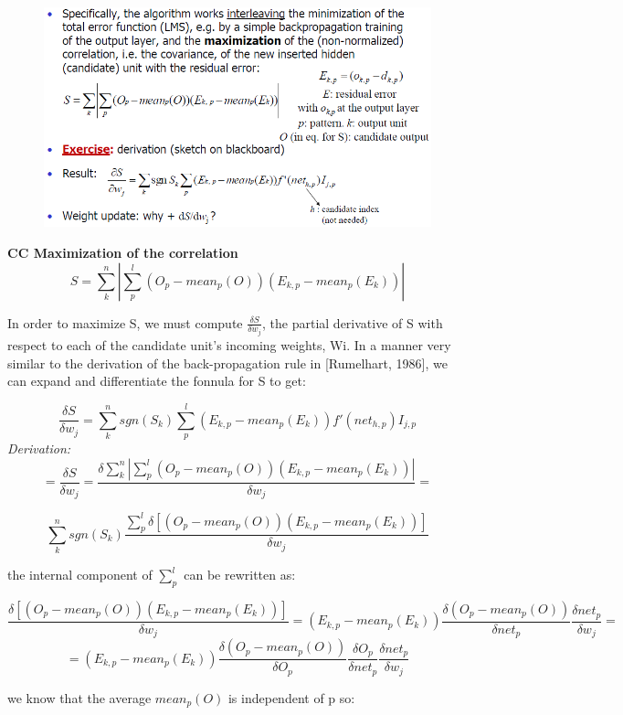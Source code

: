 \documentclass[../main.tex]{subfiles}
\begin{document}
\begin{figure}[H]
    \centering
    \includegraphics[scale = 0.74]{lectures/4_neural_networks/4_cc_learn.png}
    \label{fig:4_cc_learn}
\end{figure}

\noindent\textbf{CC Maximization of the correlation}\\
$$ S = \sum_{k}^{n} \left| \sum_{p}^{l} (O_p - mean_p(O))(E_{k,p} - mean_p(E_k)) \right|$$

In order to maximize S, we must compute $\frac{\delta S}{\delta w_j}$, the partial derivative of S with respect to each of the candidate unit's incoming weights, Wi. In a manner very similar to the derivation of the back-propagation rule in [Rumelhart, 1986], we can expand and differentiate the fonnula for S to get:

$$ \frac{\delta S}{\delta w_j} = \sum_{k}^{n} sgn(S_k) \sum_{p}^{l} (E_{k,p} - mean_p(E_k))f'(net_{h,p})I_{j,p} $$
\textit{Derivation:}\\

$$ = \frac{\delta S}{\delta w_j} = \frac{\delta\sum_{k}^{n} \left| \sum_{p}^{l} (O_p - mean_p(O))(E_{k,p} - mean_p(E_k)) \right|}{\delta w_j} = $$

$$\sum_{k}^{n} sgn(S_k) \frac{ \sum_{p}^{l} \delta [(O_p - mean_p(O))(E_{k,p} - mean_p(E_k))]}{\delta w_j}$$

the internal component of $\sum_{p}^{l}$ can be rewritten as:

$$ \frac{\delta [(O_p - mean_p(O))(E_{k,p} - mean_p(E_k))]}{\delta w_j} = (E_{k,p} - mean_p(E_k)) \frac{\delta (O_p - mean_p(O))}{\delta net_p}\frac{\delta net_p}{\delta w_j}=$$
$$ = (E_{k,p} - mean_p(E_k)) \frac{\delta (O_p - mean_p(O))}{\delta O_p}\frac{\delta O_p}{\delta net_p}\frac{\delta net_p}{\delta w_j}$$

we know that the average $mean_p(O)$ is independent of p so:
\end{document}
